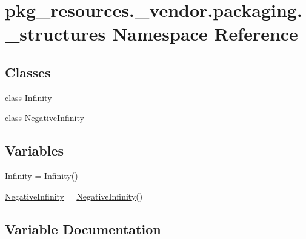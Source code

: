 \hypertarget{namespacepkg__resources_1_1__vendor_1_1packaging_1_1__structures}{}\section{pkg\+\_\+resources.\+\_\+vendor.\+packaging.\+\_\+structures Namespace Reference}
\label{namespacepkg__resources_1_1__vendor_1_1packaging_1_1__structures}
\subsection*{Classes}
\begin{DoxyCompactItemize}
\item 
class \hyperlink{classpkg__resources_1_1__vendor_1_1packaging_1_1__structures_1_1_infinity}{Infinity}
\item 
class \hyperlink{classpkg__resources_1_1__vendor_1_1packaging_1_1__structures_1_1_negative_infinity}{Negative\+Infinity}
\end{DoxyCompactItemize}
\subsection*{Variables}
\begin{DoxyCompactItemize}
\item 
\hyperlink{namespacepkg__resources_1_1__vendor_1_1packaging_1_1__structures_aee143aa292ad9b0f7d355b2374c7435c}{Infinity} = \hyperlink{classpkg__resources_1_1__vendor_1_1packaging_1_1__structures_1_1_infinity}{Infinity}()
\item 
\hyperlink{namespacepkg__resources_1_1__vendor_1_1packaging_1_1__structures_a26c25ea67496bc85a0593919613efc08}{Negative\+Infinity} = \hyperlink{classpkg__resources_1_1__vendor_1_1packaging_1_1__structures_1_1_negative_infinity}{Negative\+Infinity}()
\end{DoxyCompactItemize}


\subsection{Variable Documentation}
\mbox{\label{namespacepkg__resources_1_1__vendor_1_1packaging_1_1__structures_aee143aa292ad9b0f7d355b2374c7435c}} 
